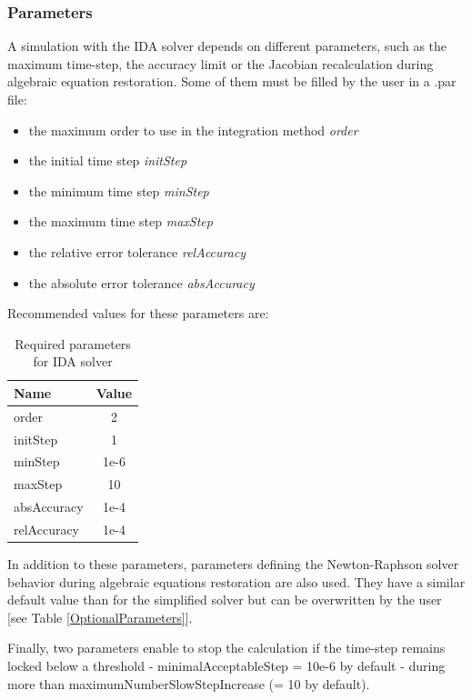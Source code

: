 \documentclass[a4paper, 12pt]{report}
\begin{document}
\subsubsection{Parameters}

A simulation with the \ac{IDA} solver depends on different parameters, such as the maximum time-step, the accuracy limit or the Jacobian recalculation during algebraic equation restoration. Some of them must be filled by the user in a .par file:
\begin{itemize}
\item the maximum order to use in the integration method \textit{order}
\item the initial time step \textit{initStep}
\item the minimum time step \textit{minStep}
\item the maximum time step \textit{maxStep}
\item the relative error tolerance \textit{relAccuracy}
\item the absolute error tolerance \textit{absAccuracy}
\end{itemize}

Recommended values for these parameters are:
\begin{table}[h!]
\center
\begin{tabular}{ l | c }
\toprule
\textbf{{Name}} & \textbf{{Value}} \\
\midrule
order & 2 \\
initStep & 1 \\
minStep & 1e-6 \\
maxStep & 10 \\
absAccuracy & 1e-4 \\
relAccuracy & 1e-4 \\
\bottomrule
\end{tabular}
\caption{Required parameters for \ac{IDA} solver}
\end{table}

In addition to these parameters, parameters defining the Newton-Raphson solver behavior during algebraic equations restoration are also used. They have a similar default value than for the simplified solver but can be overwritten by the user [see Table \ref{OptionalParameters}].

Finally, two parameters enable to stop the calculation if the time-step remains locked below a threshold - minimalAcceptableStep = 10e-6 by default - during more than
maximumNumberSlowStepIncrease (= 10 by default).


\end{document}
